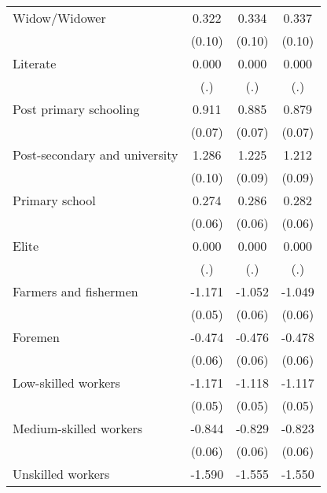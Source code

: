 {\begin{tabular}{l*{3}{c}}
Widow/Widower       &       0.322\sym{***}&       0.334\sym{***}&       0.337\sym{***}\\
                    &      (0.10)         &      (0.10)         &      (0.10)         \\
Literate            &       0.000         &       0.000         &       0.000         \\
                    &         (.)         &         (.)         &         (.)         \\
Post primary schooling&       0.911\sym{***}&       0.885\sym{***}&       0.879\sym{***}\\
                    &      (0.07)         &      (0.07)         &      (0.07)         \\
Post-secondary and university&       1.286\sym{***}&       1.225\sym{***}&       1.212\sym{***}\\
                    &      (0.10)         &      (0.09)         &      (0.09)         \\
Primary school      &       0.274\sym{***}&       0.286\sym{***}&       0.282\sym{***}\\
                    &      (0.06)         &      (0.06)         &      (0.06)         \\
Elite               &       0.000         &       0.000         &       0.000         \\
                    &         (.)         &         (.)         &         (.)         \\
Farmers and fishermen&      -1.171\sym{***}&      -1.052\sym{***}&      -1.049\sym{***}\\
                    &      (0.05)         &      (0.06)         &      (0.06)         \\
Foremen             &      -0.474\sym{***}&      -0.476\sym{***}&      -0.478\sym{***}\\
                    &      (0.06)         &      (0.06)         &      (0.06)         \\
Low-skilled workers &      -1.171\sym{***}&      -1.118\sym{***}&      -1.117\sym{***}\\
                    &      (0.05)         &      (0.05)         &      (0.05)         \\
Medium-skilled workers&      -0.844\sym{***}&      -0.829\sym{***}&      -0.823\sym{***}\\
                    &      (0.06)         &      (0.06)         &      (0.06)         \\
Unskilled workers   &      -1.590\sym{***}&      -1.555\sym{***}&      -1.550\sym{***}\\

\end{tabular}}
